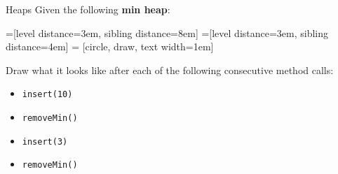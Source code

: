 \documentclass[9pt]{beamer}
\begin{document}
\begin{frame}[fragile]{Heaps}
  Given the following {\bf min heap}:

  =[level distance=3em, sibling distance=8em]
  =[level distance=3em, sibling distance=4em]
   = [circle, draw, text width=1em]


  Draw what it looks like after each of the following consecutive method
  calls:
  \begin{itemize}
    \item
      {\tt insert(10)}
    \item
      {\tt removeMin()}
    \item
      {\tt insert(3)}
    \item
      {\tt removeMin()}
  \end{itemize}
\end{frame}
\end{document}
